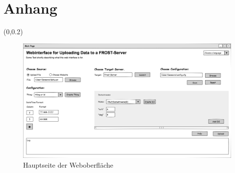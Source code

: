 \documentclass[a4paper, 12 pt]{article}
\begin{document}
\section{Anhang}
\pagestyle{empty}
\begin{textblock*}{\paperwidth}(0\paperwidth ,0.2\paperheight)
\begin{figure}[t]
\centering
\noindent\includegraphics[scale=0.5, angle=90]{images/gui}
\caption{\label{fig:guiMainA}Hauptseite der Weboberfläche}
\end{figure}
\end{textblock*}
	
\end{document}
